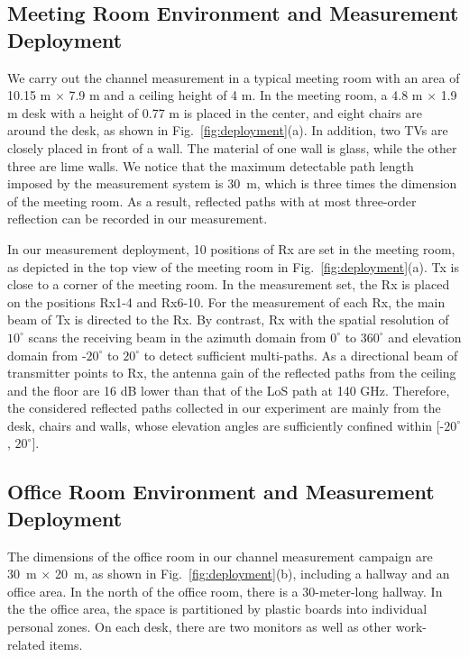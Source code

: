 \documentclass[conference]{IEEEtran}
\begin{document}
\subsection{Meeting Room Environment and Measurement Deployment}
We carry out the channel measurement in a typical meeting room with an area of 10.15 m $\times$ 7.9 m and a ceiling height of 4 m. In the meeting room, a 4.8 m $\times$ 1.9 m desk with a height of 0.77 m is placed in the center, and eight chairs are around the desk, as shown in Fig.~\ref{fig:deployment}(a). In addition, two TVs are closely placed in front of a wall. The material of one wall is glass, while the other three are lime walls. We notice that the maximum detectable path length imposed by the measurement system is 30~m, which is three times the dimension of the meeting room. As a result, reflected paths with at most three-order reflection can be recorded in our measurement. 
\par  In our measurement deployment, 10 positions of Rx are set in the meeting room,  as depicted in the top view of the meeting room in Fig.~\ref{fig:deployment}(a). Tx is close to a corner of the meeting room. In the measurement set, the Rx is placed on the positions Rx1-4 and Rx6-10. For the measurement of each Rx, the main beam of Tx is directed to the Rx. By contrast, Rx with the spatial resolution of $10^\circ$ scans the receiving beam in the azimuth domain from $0^\circ$ to $360^\circ$ and elevation domain from -$20^\circ$ to $20^\circ$ to detect sufficient multi-paths. As a directional beam of transmitter points to Rx, the antenna gain of the reflected paths from the ceiling and the floor are 16 dB lower than that of the LoS path at 140 GHz. Therefore, the considered reflected paths collected in our experiment are mainly from the desk, chairs and walls, whose elevation angles are sufficiently confined within [-$20^\circ$, $20^\circ$].


\subsection{Office Room Environment and Measurement Deployment}
The dimensions of the office room in our channel measurement campaign are 30~m $\times$ 20~m, as shown in Fig.~\ref{fig:deployment}(b), including a hallway and an office area. In the north of the office room, there is a 30-meter-long hallway. In the the office area, the space is partitioned by plastic boards into individual personal zones. On each desk, there are two monitors as well as other work-related items. 
\end{document}
